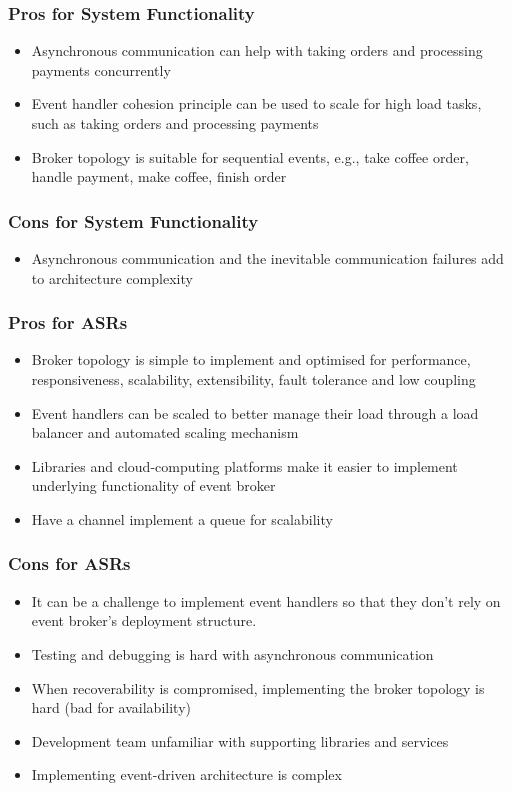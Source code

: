\documentclass{article}
\begin{document}
\subsubsection*{Pros for System Functionality}
\begin{itemize}
    \item Asynchronous communication can help with taking orders and processing payments concurrently
    \item Event handler cohesion principle can be used to scale for high load tasks, such as taking orders and processing payments
    \item Broker topology is suitable for sequential events, e.g., take coffee order, handle payment, make coffee, finish order
\end{itemize}
\subsubsection*{Cons for System Functionality}
\begin{itemize}
    \item Asynchronous communication and the inevitable communication failures add to architecture complexity
\end{itemize}

\subsubsection*{Pros for ASRs}
\begin{itemize}
    \item Broker topology is simple to implement and optimised for performance, responsiveness, scalability, extensibility, fault tolerance and low coupling
    \item Event handlers can be scaled to better manage their load through a load balancer and automated scaling mechanism
    \item Libraries and cloud-computing platforms make it easier to implement underlying functionality of event broker
    \item Have a channel implement a queue for scalability
\end{itemize}
\subsubsection*{Cons for ASRs}
\begin{itemize}
    \item It can be a challenge to implement event handlers so that they don't rely on event broker's deployment structure.
    \item Testing and debugging is hard with asynchronous communication
    \item When recoverability is compromised, implementing the broker topology is hard (bad for availability)
    \item Development team unfamiliar with supporting libraries and services
    \item Implementing event-driven architecture is complex
\end{itemize}
\end{document}
